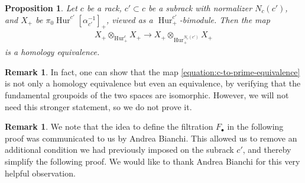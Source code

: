 \documentclass[12 pt]{amsart}
\theoremstyle{plain}
\newtheorem{proposition}[theorem]{Proposition}
\theoremstyle{definition}
\newtheorem{remark}[theorem]{Remark}
\theoremstyle{remark}
\numberwithin{equation}{section}
\DeclareMathOperator\Hur{Hur}
\begin{document}
\begin{proposition}\label{proposition:tensorproducthomotopy}
	Let $c$ be a rack, $c' \subset c$ be a subrack with normalizer $N_c(c')$,  
	and $X_+$ be $\pi_0\Hur^{c'}[\alpha_{c'}^{-1}]_+$, viewed as a $\Hur^{c'}_+$-bimodule. 
	Then the map
\begin{align}
	\label{equation:c-to-prime-equivalence}
	X_+\otimes_{\Hur^{c}_+}X_+ \to X_+\otimes_{\Hur^{N_c(c')}_+}X_+ 
\end{align}
	is a homology equivalence.
\end{proposition}
\begin{remark}
	\label{remark:}
	In fact, one can show that the map
	\eqref{equation:c-to-prime-equivalence} is not only a homology
	equivalence but even an equivalence, by verifying that the fundamental groupoids of the two spaces are isomorphic.
	However, we will not need this stronger statement, so we do not prove it.
\end{remark}
\begin{remark}
	\label{remark:}
	We note that the idea to define the filtration $F_\bullet$
in the following proof was communicated to us by Andrea Bianchi.
This allowed us to remove an additional condition 
we had previously imposed on the subrack $c'$, and thereby simplify
the following proof.
We would like to thank Andrea Bianchi for this very helpful observation.
\end{remark}
\end{document}
